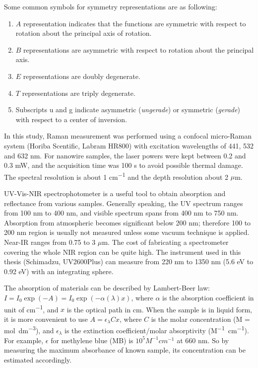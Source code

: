 Some common symbols for symmetry representations are as following:
\begin{enumerate}
\item $A$ representation indicates that the functions are symmetric with respect to rotation about the principal axis of rotation.
\item $B$ representations are asymmetric with respect to rotation about the principal axis.
\item $E$ representations are doubly degenerate.
\item $T$ representations are triply degenerate.
\item Subscripts u and g indicate asymmetric (\emph{ungerade}) or symmetric (\emph{gerade}) with respect to a center of inversion.
\end{enumerate}

In this study, Raman measurement was performed using a confocal micro-Raman system (Horiba Scentific, Labram HR800) with excitation wavelengths of 441, 532 and 632 nm. For nanowire samples, the laser powers were kept between 0.2 and 0.3 mW, and the acquisition time was 100 s to avoid possible thermal damage. The spectral resolution is about 1 \si{cm^{-1}} and the depth resolution about 2 $\mu$m.  

\iffalse
A Raman pattern database can be found at \url{http://wwwobs.univ-bpclermont.fr/sfmc/ramandb2/index.html}. 

In analytical practice, frequency is expressed in reciprocal wavelength (as cm−1), called wavenumbers;

\fi


UV-Vis-NIR spectrophotometer is a useful tool to obtain absorption and reflectance from various samples. Generally speaking, the UV spectrum ranges from 100 nm to 400 nm, and visible spectrum spans from 400 nm to 750 nm. Absorption from atmospheric  becomes significant below 200 nm; therefore 100 to 200 nm region is usually not measured unless some vacuum technique is applied. Near-IR ranges from 0.75 to 3 $\mu$m. The cost of fabricating a spectrometer covering the whole NIR region can be quite high. The instrument used in this thesis (Schimadzu, UV2600Plus) can measure from 220 nm to 1350 nm (5.6 eV to 0.92 eV) with an integrating sphere.

The absorption of materials can be described by Lambert-Beer law: $I = I_0 \exp(-A)=I_0\exp(-\alpha(\lambda) x)$, where $\alpha$ is the absorption coefficient in unit of \si{cm^{-1}}, and $x$ is the optical path in cm. When the sample is in liquid form, it is more convenient to use $A =\epsilon_\lambda C x$, where $C$ is the molar concentration (M = \si{\mole dm^{-3}}), and $\epsilon_\lambda$ is the extinction coefficient/molar absorptivity (\si{M^{-1} cm^{-1}}). For example, $\epsilon$ for methylene blue (MB) is $10^5 M^{-1}cm^{-1}$ at 660 nm.\cite{Mills1999} So by measuring the maximum absorbance of known sample, its concentration can be estimated accordingly. 

